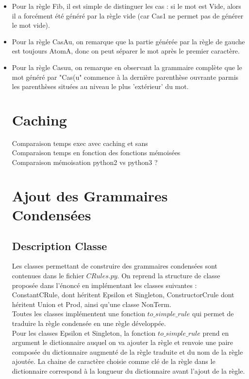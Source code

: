 \documentclass[a4paper, titlepage]{article}
\begin{document}
\begin{itemize}
\item Pour la règle Fib, il est simple de distinguer les cas : si le mot est
Vide, alors il a forcément été généré par la règle vide (car Cas1 ne
permet pas de générer le mot vide).\\
\item Pour la règle CasAu, on remarque que la partie générée par la règle de
gauche est toujours AtomA, donc on peut séparer le mot après le
premier caractère.\\
\item Pour la règle Casuu, on remarque en observant la grammaire complète
que le mot généré par "Cas(u" commence à la dernière parenthèse
ouvrante parmis les parenthèses situées au niveau le plus 'extérieur'
du mot.\\

\section{Caching}
Comparaison temps exec avec caching et sans\\
Comparaison temps en fonction des fonctions mémoisées\\
Comparaison mémoisation python2 vs python3 ?\\

\section{Ajout des Grammaires Condensées}

\subsection{Description Classe}

Les classes permettant de construire des grammaires condensées sont
contenues dans le fichier $CRules.py$. On reprend la structure de
classe proposée dans l'énoncé en implémentant les classes suivantes :
ConstantCRule, dont héritent Epsilon et Singleton, ConstructorCrule
dont héritent Union et Prod, ainsi qu'une classe NonTerm.\\

Toutes les classes implémentent une fonction $to\_simple\_rule$ qui
permet de traduire la règle condensée en une règle développée. \\

Pour les classes Epsilon et Singleton, la fonction $to\_simple\_rule$
prend en argument le dictionnaire auquel on va ajouter la règle et
renvoie une paire composée du dictionnaire augmenté de la règle
traduite et du nom de la règle ajoutée. La chaine de caractère choisie
comme clé de la règle dans le dictionnaire correspond à la longueur du
dictionnaire avant l'ajout de la règle. \\


\end{itemize}
\end{document}
